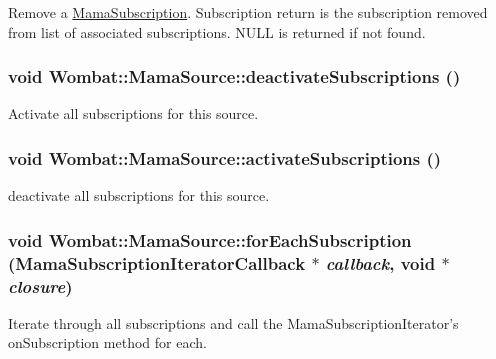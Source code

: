 Remove a \hyperlink{classWombat_1_1MamaSubscription}{MamaSubscription}. Subscription return is the subscription removed from list of associated subscriptions. NULL is returned if not found. \hypertarget{classWombat_1_1MamaSource_a050dd41f5dcf8895205e99bab7a6cabc}{
\subsubsection[{deactivateSubscriptions}]{\setlength{\rightskip}{0pt plus 5cm}void Wombat::MamaSource::deactivateSubscriptions ()}}
\label{classWombat_1_1MamaSource_a050dd41f5dcf8895205e99bab7a6cabc}


Activate all subscriptions for this source. \hypertarget{classWombat_1_1MamaSource_ae41795d8888a4f775ba67f5526359aaf}{
\subsubsection[{activateSubscriptions}]{\setlength{\rightskip}{0pt plus 5cm}void Wombat::MamaSource::activateSubscriptions ()}}
\label{classWombat_1_1MamaSource_ae41795d8888a4f775ba67f5526359aaf}


deactivate all subscriptions for this source. \hypertarget{classWombat_1_1MamaSource_a22c2ffa8102399808dc20ef6b4517768}{
\subsubsection[{forEachSubscription}]{\setlength{\rightskip}{0pt plus 5cm}void Wombat::MamaSource::forEachSubscription ({\bf MamaSubscriptionIteratorCallback} $\ast$ {\em callback}, \/  void $\ast$ {\em closure})}}
\label{classWombat_1_1MamaSource_a22c2ffa8102399808dc20ef6b4517768}


Iterate through all subscriptions and call the MamaSubscriptionIterator's onSubscription method for each. 